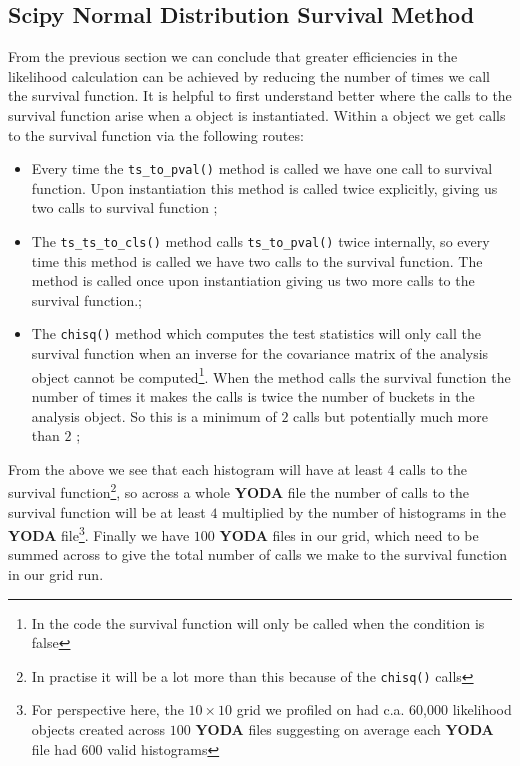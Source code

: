\subsection{Scipy Normal Distribution Survival Method}
From the previous section we can conclude that greater efficiencies in the likelihood calculation can be achieved by reducing the number of times we call the survival function. It is helpful to first understand better where the calls to the survival function arise when a  object is instantiated. Within a  object we get calls to the survival function via the following routes:

\begin{itemize}
\item[1.] Every time the \texttt{ts\_to\_pval()} method is called we have one call to survival function. Upon instantiation this method is called twice explicitly, giving us two calls to survival function ;
\item[2.]The \texttt{ts\_ts\_to\_cls()} method calls \texttt{ts\_to\_pval()} twice internally, so every time this method is called we have two calls to the survival function. The method is called once upon instantiation giving us two more calls to the survival function.;
\item[3.] The \texttt{chisq()} method which computes the test statistics will only call the survival function when an inverse for the covariance matrix of the analysis object cannot be computed\footnote{In the code the survival function will only be called when the condition  is false}. When the method calls the survival function the number of times it makes the calls is twice the number of buckets in the analysis object. So this is a minimum of $2$ calls but potentially much more than $2$ ;
\end{itemize}

From the above we see that each histogram will have at least $4$ calls to the survival function\footnote{In practise it will be a lot more than this because of the \texttt{chisq()} calls}, so across a whole \textbf{YODA} file the number of calls to the survival function will be at least $4$ multiplied by the number of histograms in the \textbf{YODA} file\footnote{For perspective here, the $10\times 10$ grid we profiled on had c.a. 60,000 likelihood objects created across $100$ \textbf{YODA} files suggesting on average each \textbf{YODA} file had $600$ valid histograms}. Finally we have $100$ \textbf{YODA} files in our grid, which need to be summed across to give the total number of calls we make to the survival function in our grid run.

